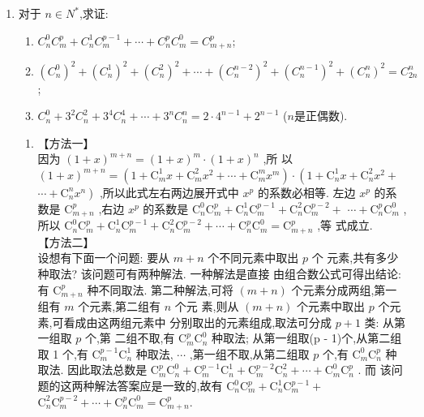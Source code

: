 \begin{enumerate}
\item 对于 $n\in N^{*}$,求证:
\begin{enumerate}
\item $C_{n}^{0}C_{m}^{p}+C_{n}^{1}C_{m}^{p-1}+\cdots+C_{n}^{p}C_{m}^{0}=C_{m+n}^{p}$;
\item $(C_{n}^{0})^{2}+(C_{n}^{1})^{2}+(C_{n}^{2})^{2}+\cdots+(C_{n}^{n-2})^{2}+(C_{n}^{n-1})^{2}+(C_{n}^{n})^{2}=C_{2n}^{n}$;
\item $C_{n}^{0}+3^{2}C_{n}^{2}+3^{4}C_{n}^{4}+\cdots+3^{n}C_{n}^{n}=2\cdot4^{n-1}+2^{n-1}$ ($n$是正偶数).
\end{enumerate}
\begin{jieda}
\begin{enumerate}
    \item 【方法一】\\
    因为 ${\left( 1 + x\right) }^{m + n} = {\left( 1 + x\right) }^{m} \cdot  {\left( 1 + x\right) }^{n}$ ,所
以 ${\left( 1 + x\right) }^{m + n} = \left( {1 + {\mathrm{C}}_{m}^{1}x + {\mathrm{C}}_{m}^{2}{x}^{2} + \cdots  + {\mathrm{C}}_{m}^{m}{x}^{m}}\right)  \cdot  \left( {1 + {\mathrm{C}}_{n}^{1}x + {\mathrm{C}}_{n}^{2}{x}^{2} + }\right.$
$\left. {\cdots  + {\mathrm{C}}_{n}^{n}{x}^{n}}\right)$ ,所以此式左右两边展开式中 ${x}^{p}$ 的系数必相等. 左边
${x}^{p}$ 的系数是 ${\mathrm{C}}_{m + n}^{p}$ ,右边 ${x}^{p}$ 的系数是 ${\mathrm{C}}_{n}^{0}{\mathrm{C}}_{m}^{p} + {\mathrm{C}}_{n}^{1}{\mathrm{C}}_{m}^{p - 1} + {\mathrm{C}}_{n}^{2}{\mathrm{C}}_{m}^{p - 2} +$
$\cdots  + {\mathrm{C}}_{n}^{p}{\mathrm{C}}_{m}^{0}$ ,所以 ${\mathrm{C}}_{n}^{0}{\mathrm{C}}_{m}^{p} + {\mathrm{C}}_{n}^{1}{\mathrm{C}}_{m}^{p - 1} + {\mathrm{C}}_{n}^{2}{\mathrm{C}}_{m}^{p - 2} + \cdots  + {\mathrm{C}}_{n}^{p}{\mathrm{C}}_{m}^{0} = {\mathrm{C}}_{m + n}^{p}$ ,等
式成立.\\
【方法二】\\
设想有下面一个问题: 要从 $m + n$ 个不同元素中取出 $p$ 个
元素,共有多少种取法? 该问题可有两种解法. 一种解法是直接
由组合数公式可得出结论: 有 ${\mathrm{C}}_{m + n}^{p}$ 种不同取法. 第二种解法,可将
$\left( {m + n}\right)$ 个元素分成两组,第一组有 $m$ 个元素,第二组有 $n$ 个元
素,则从 $\left( {m + n}\right)$ 个元素中取出 $p$ 个元素,可看成由这两组元素中
分别取出的元素组成,取法可分成 $p + 1$ 类: 从第一组取 $p$ 个,第
二组不取,有 ${\mathrm{C}}_{m}^{p}{\mathrm{C}}_{n}^{0}$ 种取法; 从第一组取(p - 1)个,从第二组取 1
个,有 ${\mathrm{C}}_{m}^{p - 1}{\mathrm{C}}_{n}^{1}$ 种取法, $\cdots$ ,第一组不取,从第二组取 $p$ 个,有 ${\mathrm{C}}_{m}^{0}{\mathrm{C}}_{n}^{p}$
种取法. 因此取法总数是 ${\mathrm{C}}_{m}^{p}{\mathrm{C}}_{n}^{0} + {\mathrm{C}}_{m}^{p - 1}{\mathrm{C}}_{n}^{1} + {\mathrm{C}}_{m}^{p - 2}{\mathrm{C}}_{n}^{2} + \cdots  + {\mathrm{C}}_{m}^{0}{\mathrm{C}}_{n}^{p}$ . 而
该问题的这两种解法答案应是一致的,故有 ${\mathrm{C}}_{n}^{0}{\mathrm{C}}_{m}^{p} + {\mathrm{C}}_{n}^{1}{\mathrm{C}}_{m}^{p - 1} +$
${\mathrm{C}}_{n}^{2}{\mathrm{C}}_{m}^{p - 2} + \cdots  + {\mathrm{C}}_{n}^{p}{\mathrm{C}}_{m}^{0} = {\mathrm{C}}_{m + n}^{p}.$


\end{enumerate}
\end{jieda}
\end{enumerate}
